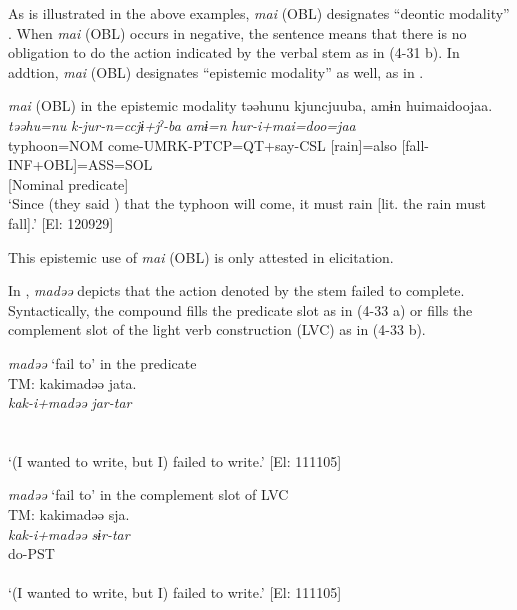 As is illustrated in the above examples, \textit{mai} (OBL) designates “deontic modality” \citep[823]{Lyons1977}. When \textit{mai} (OBL) occurs in negative, the sentence means that there is no obligation to do the action indicated by the verbal stem as in (4-31 b). In addtion, \textit{mai} (OBL) designates “epistemic modality” \citep[793-809]{Lyons1977} as well, as in .

\ea  \textit{mai} (OBL) in the epistemic modality \label{ex:4.32}
  \gllll təəhunu  kjuncjuuba,  amɨn   huimaidoojaa.\\
    \textit{təəhu=nu}  \textit{k-jur-n=ccjɨ+jˀ-ba}  \textit{amɨ=n} \textit{hur-i+mai=doo=jaa}\\                                                                   
    typhoon=NOM  come-UMRK-PTCP=QT+say-CSL  [rain]=also  [fall-INF+OBL]=ASS=SOL\\                                                                   
        [Subject]                                         [Nominal predicate]\\
  \glt ‘Since (they said ) that the typhoon will come, it must rain [lit. the rain must fall].’  [El: 120929]
\z

This epistemic use of \textit{mai} (OBL) is only attested in elicitation.

In , \textit{madəə} depicts that the action denoted by the stem failed to complete. Syntactically, the compound fills the predicate slot as in (4-33 a) or fills the complement slot of the light verb construction (LVC) as in (4-33 b).

\ea \label{ex:4.33}
\ea \textit{madəə} ‘fail to’ in the predicate \label{ex:4.33a}\\
\gllll  TM:  kakimadəə  jata.\\
    \textit{kak-i+madəə}  \textit{jar-tar}\\
    [write-INF+fail.to  COP-PST]\\
    [Nominal predicate]\\
  \glt     ‘(I wanted to write, but I) failed to write.’ [El: 111105]

\ex \textit{madəə} ‘fail to’ in the complement slot of LVC\\
\gllll  TM:  kakimadəə  sja.\\
    \textit{kak-i+madəə}  \textit{sɨr-tar}\\
    [write-INF+fail.to]  do-PST\\
    [Complement]  \\
  \glt     ‘(I wanted to write, but I) failed to write.’ [El: 111105]
  \z
\z

